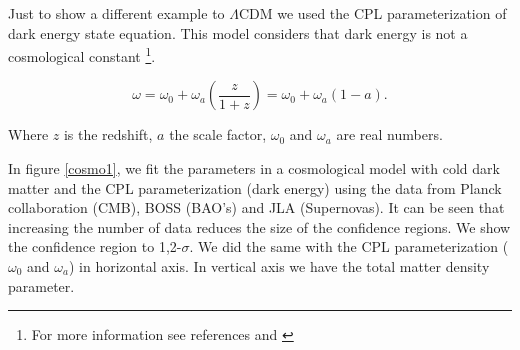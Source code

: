 \documentclass[onecolumn,           %
               showpacs,            %
               preprintnumbers,     %
               aps,                 %
               prl,          	    %
               letterpaper,             %
               superscriptaddress,      %
               nofootinbib,         %
               tightenlines,        %
               floats,floatfix      %
               ,usenatbib,
               ]{revtex4-1}
\begin{document}
Just to show a different example to $\Lambda$CDM we used the CPL parameterization of dark energy state equation. This model considers that dark energy is not a cosmological constant \footnote{For more information see references \cite{CPL1} and \cite{CPL2}}. 

\begin{equation}
\omega = \omega_0 + \omega_a\left(\frac{z}{1 + z}\right) = \omega_0 + \omega_a\left(1 - a\right).
\end{equation}

Where $z$ is the redshift, $a$ the scale factor, $\omega_0$ and $\omega_a$ are real numbers.

In figure \ref{cosmo1}, we fit the parameters in a cosmological model with cold dark matter and the CPL parameterization (dark energy) using the data from Planck collaboration (CMB), BOSS (BAO's) and JLA (Supernovas). It can be seen that increasing the number of data reduces the size of the confidence regions. We show the confidence region to 1,2-$\sigma$. We did the same with the CPL parameterization ($\omega_0$ and  $\omega_a$) in horizontal axis. In vertical axis we have the total matter density parameter.
\end{document}
